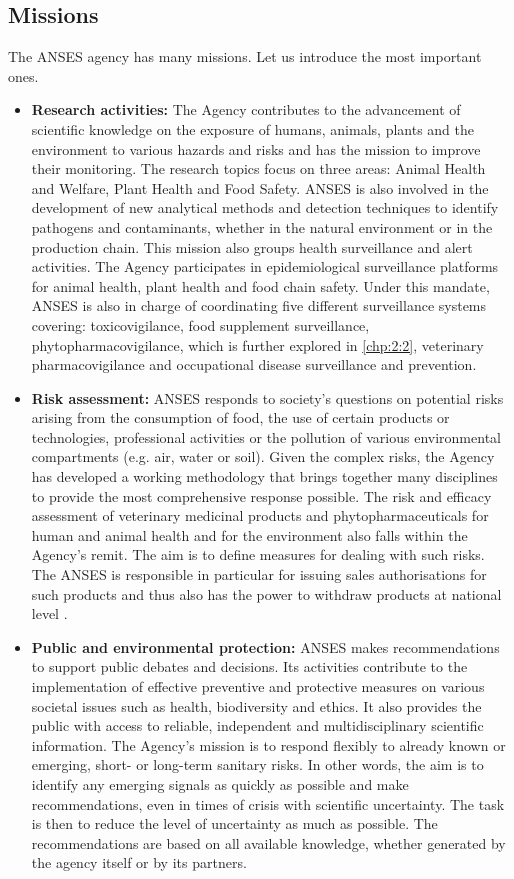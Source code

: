 \subsection{Missions} 

The ANSES agency has many missions. Let us introduce the most important ones.
\begin{itemize}
\item \textbf{Research activities:} The Agency contributes to the advancement of scientific knowledge on the exposure of humans, animals, plants and the environment to various hazards and risks and has the mission to improve their monitoring. The research topics focus on three areas: Animal Health and Welfare, Plant Health and Food Safety. ANSES is also involved in the development of new analytical methods and detection techniques to identify pathogens and contaminants, whether in the natural environment or in the production chain. This mission also groups health surveillance and alert activities. The Agency participates in epidemiological surveillance platforms for animal health, plant health and food chain safety. Under this mandate, ANSES is also in charge of coordinating five different surveillance systems covering: toxicovigilance, food supplement surveillance, phytopharmacovigilance, which is further explored in \ref{chp:2:2}, veterinary pharmacovigilance and occupational disease surveillance and prevention. 
\item \textbf{Risk assessment:} ANSES responds to society's questions on potential risks arising from the consumption of food, the use of certain products or technologies, professional activities or the pollution of various environmental compartments (e.g. air, water or soil). Given the complex risks, the Agency has developed a working methodology that brings together many disciplines to provide the most comprehensive response possible. The risk and efficacy assessment of veterinary medicinal products and phytopharmaceuticals for human and animal health and for the environment also falls within the Agency's remit. The aim is to define measures for dealing with such risks. The ANSES is responsible in particular for issuing sales authorisations for such products and thus also has the power to withdraw products at national level \citep{ansesdec}. 
\item \textbf{Public and environmental protection:} ANSES makes recommendations to support public debates and decisions. Its activities contribute to the implementation of effective preventive and protective measures on various societal issues such as health, biodiversity and ethics. It also provides the public with access to reliable, independent and multidisciplinary scientific information. The Agency's mission is to respond flexibly to already known or emerging, short- or long-term sanitary risks. In other words, the aim is to identify any emerging signals as quickly as possible and make recommendations, even in times of crisis with scientific uncertainty. The task is then to reduce the level of uncertainty as much as possible. The recommendations are based on all available knowledge, whether generated by the agency itself or by its partners. 
\end{itemize}

